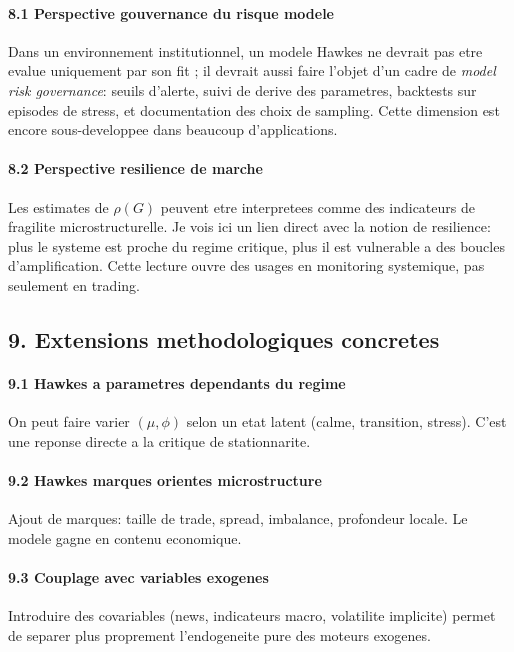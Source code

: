 \documentclass[11pt,a4paper]{article}
\begin{document}
\paragraph{8.1 Perspective gouvernance du risque modele}
Dans un environnement institutionnel, un modele Hawkes ne devrait pas etre evalue uniquement par son fit ; il devrait aussi faire l'objet d'un cadre de \emph{model risk governance}: seuils d'alerte, suivi de derive des parametres, backtests sur episodes de stress, et documentation des choix de sampling. Cette dimension est encore sous-developpee dans beaucoup d'applications.

\paragraph{8.2 Perspective resilience de marche}
Les estimates de $\rho(G)$ peuvent etre interpretees comme des indicateurs de fragilite microstructurelle. Je vois ici un lien direct avec la notion de resilience: plus le systeme est proche du regime critique, plus il est vulnerable a des boucles d'amplification. Cette lecture ouvre des usages en monitoring systemique, pas seulement en trading.

\subsection*{9. Extensions methodologiques concretes}

\paragraph{9.1 Hawkes a parametres dependants du regime}
On peut faire varier $(\mu,\phi)$ selon un etat latent (calme, transition, stress). C'est une reponse directe a la critique de stationnarite.

\paragraph{9.2 Hawkes marques orientes microstructure}
Ajout de marques: taille de trade, spread, imbalance, profondeur locale. Le modele gagne en contenu economique.

\paragraph{9.3 Couplage avec variables exogenes}
Introduire des covariables (news, indicateurs macro, volatilite implicite) permet de separer plus proprement l'endogeneite pure des moteurs exogenes.
\end{document}
